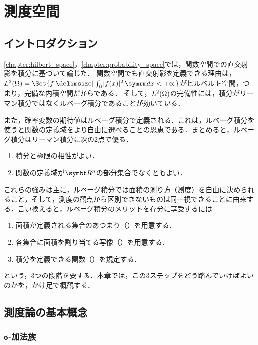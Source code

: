 \documentclass[../../main]{subfiles}
\begin{document}
\chapter{測度空間}

\section{イントロダクション}

\cref{chapter:hilbert_space}，\cref{chapter:probability_space}では，関数空間での直交射影を積分に基づいて論じた．
関数空間でも直交射影を定義できる理由は，\(\Lebesgue{2}(\Omega)=\Set{f\given\int_\Omega\abs{f(x)}^2\intd{x}<+\infty}\)がヒルベルト空間，つまり，完備な内積空間だからである．
そして，\(L^2(\Omega)\)の完備性には，積分がリーマン積分ではなくルベーグ積分であることが効いている．

また，確率変数の期待値はルベーグ積分で定義される．これは，ルベーグ積分を使うと関数の定義域をより自由に選べることの恩恵である．まとめると，ルベーグ積分はリーマン積分に次の2点で優る．
\begin{enumerate}
  \item 積分と極限の相性がよい．
  \item 関数の定義域が\(\numset{R}^n\)の部分集合でなくともよい．
\end{enumerate}

これらの強みは主に，ルベーグ積分では面積の測り方（測度）を自由に決められること，そして，測度の観点から区別できないものは同一視できることに由来する．言い換えると，ルベーグ積分のメリットを存分に享受するには
\begin{enumerate}
  \item 面積が定義される集合のあつまり（）を用意する．
  \item 各集合に面積を割り当てる写像（）を用意する．
  \item 積分を定義できる関数（）を規定する．
\end{enumerate}
という，3つの段階を要する．本章では，この3ステップをどう踏んでいけばよいのかを，かけ足で概観する．

\section{測度論の基本概念}

\subsection{σ‐加法族}
\end{document}
